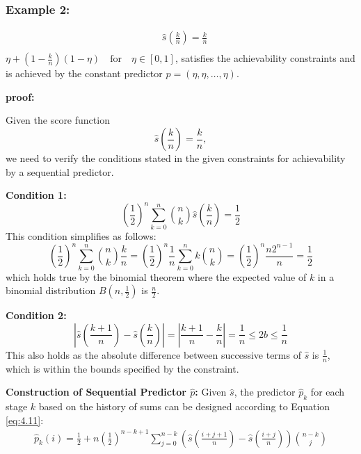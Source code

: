 \documentclass[11pt]{article}
\numberwithin{equation}{section}
\theoremstyle{boldStyle}
\begin{document}
\bigbreak

\subsubsection{Example 2:}

\begin{align*}
    &\hat{s} \left( \frac{k}{n} \right)= \frac{k}{n} \\
\end{align*}
$\eta + (1 - \frac{k}{n})(1 - \eta) \quad \text{for} \quad \eta \in [0, 1]$, satisfies the achievability constraints and is achieved by 
the constant predictor $p = (\eta, \eta, \ldots, \eta)$.

\textbf{proof:}

Given the score function 
\[
\hat{s}\left(\frac{k}{n}\right) = \frac{k}{n},
\]
we need to verify the conditions stated in the given constraints for achievability by a sequential predictor.


\textbf{Condition 1:}
\[
\left(\frac{1}{2}\right)^n \sum_{k=0}^n \binom{n}{k} \hat{s} \left(\frac{k}{n}\right) = \frac{1}{2}
\]
This condition simplifies as follows:
\[
\left(\frac{1}{2}\right)^n \sum_{k=0}^n \binom{n}{k} \frac{k}{n} = \left(\frac{1}{2}\right)^n \frac{1}{n} \sum_{k=0}^n k \binom{n}{k} = \left(\frac{1}{2}\right)^n \frac{n 2^{n-1}}{n} = \frac{1}{2}
\]
which holds true by the binomial theorem where the expected value of $k$ in a binomial distribution $B(n, \frac{1}{2})$ is $\frac{n}{2}$.

\textbf{Condition 2:}
\[
\left| \hat{s} \left(\frac{k+1}{n}\right) - \hat{s} \left(\frac{k}{n}\right) \right| = \left| \frac{k+1}{n} - \frac{k}{n} \right| = \frac{1}{n} \leq 2b \leq \frac{1}{n}
\]
This also holds as the absolute difference between successive terms of $\hat{s}$ is $\frac{1}{n}$, which is within the bounds specified by the constraint.

\bigbreak

\textbf{Construction of Sequential Predictor $\hat{p}$:}
Given $\hat{s}$, the predictor $\hat{p}_k$ for each stage $k$ based on the history of sums can be designed according 
to Equation \ref{eq:4.11}:
\begin{align*}
    \hat{p}_k(i) = \frac{1}{2} + n \left(\frac{1}{2}\right)^{n-k+1} 
    \sum_{j=0}^{n-k} \left(\hat{s} \left( \frac{i+j+1}{n} \right) - \hat{s} \left( \frac{i+j}{n} \right) \right) \binom{n-k}{j}
\end{align*}
\end{document}
